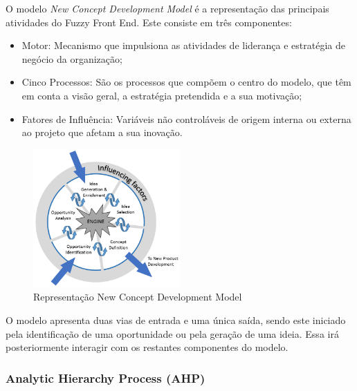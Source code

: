 O modelo \emph{New Concept Development Model} é a representação das principais atividades do Fuzzy Front End. Este consiste em três componentes:

\begin{itemize}

\item Motor: Mecanismo que impulsiona as atividades de liderança e estratégia de negócio da organização;

\item Cinco Processos: São os processos que compõem o centro do modelo, que têm em conta a visão geral, a estratégia pretendida e a sua motivação;

\item Fatores de Influência: Variáveis não controláveis de origem interna ou externa ao projeto que afetam a sua inovação.

\end{itemize}

\begin{figure}[h]
    \begin{center}
    \includegraphics[width=0.5\textwidth]{figures/The-New-Concept-Development-NCD-model-Koen-et-al-2001.png}
    \caption{Representação New Concept Development Model}
    \end{center}
\end{figure}

O modelo apresenta duas vias de entrada e uma única saída, sendo este iniciado pela identificação de uma oportunidade ou pela geração de uma ideia. Essa irá posteriormente interagir com os restantes componentes do modelo.

\subsubsection{Analytic Hierarchy Process (AHP) \label{sym:AHP}}

